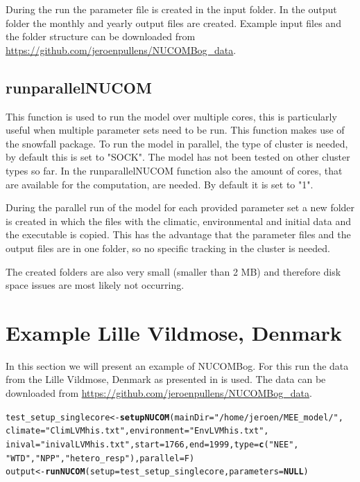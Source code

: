 \documentclass{article}\usepackage[]{graphicx}\usepackage[]{color}
\makeatletter
\newcommand{\hlnum}[1]{\textcolor[rgb]{0.686,0.059,0.569}{#1}}%
\newcommand{\hlstr}[1]{\textcolor[rgb]{0.192,0.494,0.8}{#1}}%
\newcommand{\hlstd}[1]{\textcolor[rgb]{0.345,0.345,0.345}{#1}}%
\newcommand{\hlkwa}[1]{\textcolor[rgb]{0.161,0.373,0.58}{\textbf{#1}}}%
\newcommand{\hlkwb}[1]{\textcolor[rgb]{0.69,0.353,0.396}{#1}}%
\newcommand{\hlkwc}[1]{\textcolor[rgb]{0.333,0.667,0.333}{#1}}%
\newcommand{\hlkwd}[1]{\textcolor[rgb]{0.737,0.353,0.396}{\textbf{#1}}}%
\newenvironment{kframe}{%
 \def\at@end@of@kframe{}%
 \ifinner\ifhmode%
  \def\at@end@of@kframe{\end{minipage}}%
  \begin{minipage}{\columnwidth}%
 \fi\fi%
 \def\FrameCommand##1{\hskip\@totalleftmargin \hskip-\fboxsep
 \colorbox{shadecolor}{##1}\hskip-\fboxsep
     \hskip-\linewidth \hskip-\@totalleftmargin \hskip\columnwidth}%
 \MakeFramed {\advance\hsize-\width
   \@totalleftmargin\z@ \linewidth\hsize
   \@setminipage}}%
 {\par\unskip\endMakeFramed%
 \at@end@of@kframe}
\newenvironment{knitrout}{}{} %
\makeatother
\begin{document}
During the run the parameter file is created in the input folder. In the output folder the monthly and yearly output files are created. Example input files and the folder structure can be downloaded from \url{https://github.com/jeroenpullens/NUCOMBog_data}.

\subsection*{runparallelNUCOM} \label{ssec:runparallelNUCOM}
This function is used to run the model over multiple cores, this is particularly useful when multiple parameter sets need to be run. This function makes use of the snowfall \citep{Knaus2013} package. To run the model in parallel, the type of cluster is needed, by default this is set to "SOCK". The model has not been tested on other cluster types so far. In the runparallelNUCOM function also the amount of cores, that are available for the computation, are needed. By default it is set to "1".

During the parallel run of the model for each provided parameter set a new folder is created in which the files with the climatic, environmental and initial data and the executable is copied. This has the advantage that the parameter files and the output files are in one folder, so no specific tracking in the cluster is needed.

The created folders are also very small (smaller than 2 MB) and therefore disk space issues are most likely not occurring.

\section{Example Lille Vildmose, Denmark}
In this section we will present an example of NUCOMBog. For this run the data from the Lille Vildmose, Denmark as presented in \cite{Heijmans2008a} is used. The data can be downloaded from \url{https://github.com/jeroenpullens/NUCOMBog_data}.



\begin{knitrout}
\color{fgcolor}\begin{kframe}
\begin{alltt}
\hlstd{test_setup_singlecore} \hlkwb{<-} \hlkwd{setupNUCOM}\hlstd{(}\hlkwc{mainDir} \hlstd{=} \hlstr{"/home/jeroen/MEE_model/"}\hlstd{,}
    \hlkwc{climate} \hlstd{=} \hlstr{"ClimLVMhis.txt"}\hlstd{,} \hlkwc{environment} \hlstd{=} \hlstr{"EnvLVMhis.txt"}\hlstd{,}
    \hlkwc{inival} \hlstd{=} \hlstr{"inivalLVMhis.txt"}\hlstd{,} \hlkwc{start} \hlstd{=} \hlnum{1766}\hlstd{,} \hlkwc{end} \hlstd{=} \hlnum{1999}\hlstd{,} \hlkwc{type} \hlstd{=} \hlkwd{c}\hlstd{(}\hlstr{"NEE"}\hlstd{,}
        \hlstr{"WTD"}\hlstd{,} \hlstr{"NPP"}\hlstd{,} \hlstr{"hetero_resp"}\hlstd{),} \hlkwc{parallel} \hlstd{= F)}
\hlstd{output} \hlkwb{<-} \hlkwd{runNUCOM}\hlstd{(}\hlkwc{setup} \hlstd{= test_setup_singlecore,} \hlkwc{parameters} \hlstd{=} \hlkwa{NULL}\hlstd{)}
\end{alltt}
\end{kframe}
\end{knitrout}
\end{document}
